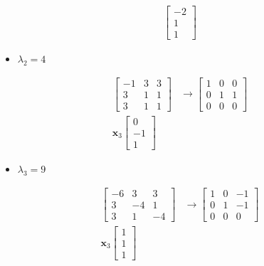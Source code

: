 \documentclass[12pt, a4paper]{scrartcl}
\begin{document}
\begin{enumerate}
\begin{enumerate}
\begin{align*}
\begin{bmatrix}
                        -2\\1\\1
                    \end{bmatrix}
                \end{align*}
                \begin{itemize}
                    \item[] $\lambda_2=4$
                \end{itemize}
                \begin{align*}
                    \begin{bmatrix}
                        -1&3&3\\3&1&1\\3&1&1
                    \end{bmatrix} &\to \begin{bmatrix}
                        1&0&0\\0&1&1\\0&0&0
                    \end{bmatrix}
                    \\ \textbf{x}_3\begin{bmatrix}
                        0\\-1\\1
                    \end{bmatrix}
                \end{align*}
                \begin{itemize}
                    \item[] $\lambda_3=9$
                \end{itemize}
                \begin{align*}
                    \begin{bmatrix}
                        -6&3&3\\3&-4&1\\3&1&-4
                    \end{bmatrix} &\to \begin{bmatrix}
                        1&0&-1\\0&1&-1\\0&0&0
                    \end{bmatrix}
                    \\ \textbf{x}_3\begin{bmatrix}
                        1\\1\\1
                    \end{bmatrix}

\end{align*}
\end{enumerate}
\end{enumerate}
\end{document}
